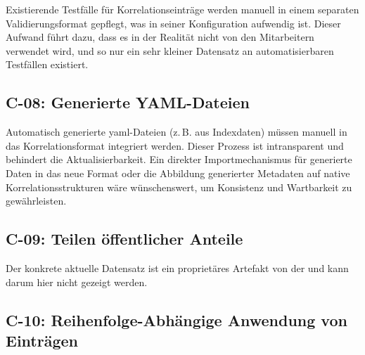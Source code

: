 Existierende Testfälle für Korrelationseinträge werden manuell in einem separaten Validierungsformat gepflegt, was in seiner Konfiguration aufwendig ist.
Dieser Aufwand führt dazu, dass es in der Realität nicht von den Mitarbeitern verwendet wird, und so nur ein sehr kleiner Datensatz an automatisierbaren Testfällen existiert.

\subsection{C-08: Generierte YAML-Dateien}\label{subsec:c-08-generated-correlation-data}



Automatisch generierte \acrshort{yaml}-Dateien (z.\,B. aus Indexdaten) müssen manuell in das Korrelationsformat integriert werden.
Dieser Prozess ist intransparent und behindert die Aktualisierbarkeit.
Ein direkter Importmechanismus für generierte Daten in das neue Format oder die Abbildung generierter Metadaten auf native Korrelationsstrukturen wäre wünschenswert, um Konsistenz und Wartbarkeit zu gewährleisten.

\subsection{C-09: Teilen öffentlicher Anteile}\label{subsec:c-09-sharing-of-public-data}



Der konkrete aktuelle Datensatz ist ein proprietäres Artefakt von der \metaeffektsp und kann darum hier nicht gezeigt werden.

\subsection{C-10: Reihenfolge-Abhängige Anwendung von Einträgen}\label{subsec:c-10-order-dependency}

